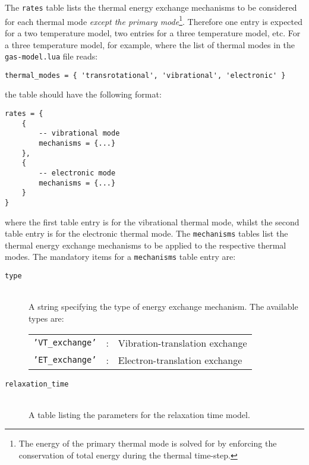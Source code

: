 The \texttt{rates} table lists the thermal energy exchange mechanisms to be considered for 
each thermal mode \textit{except the primary mode}\footnote{The energy of the primary thermal
mode is solved for by enforcing the conservation of total energy during the thermal time-step.}.
Therefore one entry is expected for a two temperature model, two entries for a three 
temperature model, etc.
For a three temperature model, for example, where the list of thermal modes in the
\texttt{gas-model.lua} file reads:

\begin{verbatim}
thermal_modes = { 'transrotational', 'vibrational', 'electronic' }
\end{verbatim}

\noindent the table should have the following format:

\begin{verbatim}
rates = {
    {
        -- vibrational mode
        mechanisms = {...}
    },
    {
        -- electronic mode
        mechanisms = {...}
    }
}
\end{verbatim}

\noindent where the first table entry is for the vibrational thermal mode, whilst the second 
table entry is for the electronic thermal mode.
The \texttt{mechanisms} tables list the thermal energy exchange mechanisms to be applied to
the respective thermal modes.
The mandatory items for a \texttt{mechanisms} table entry are:

\begin{description}
 \item[\texttt{type}] \hspace{1cm} \\
 A string specifying the type of energy exchange mechanism.
 The available types are: \\
   \begin{tabular}{lll}
    \texttt{'VT\_exchange'} & : & Vibration-translation exchange \\
    \texttt{'ET\_exchange'} & : & Electron-translation exchange \\
   \end{tabular}
\item[\texttt{relaxation\_time}] \hspace{1cm} \\
    A table listing the parameters for the relaxation time model.
\end{description}

